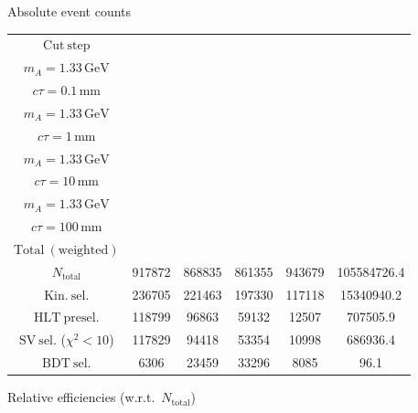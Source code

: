 \documentclass[10pt,a4paper]{article}
\renewcommand{\arraystretch}{1.4}
\begin{document}
{\footnotesize\setlength{\tabcolsep}{4pt}\renewcommand{\arraystretch}{1.05}%
\vspace{12pt}

Absolute event counts

\begin{tabular}{cccccc}
\toprule
$\mathrm{Cut\ step}$ & \shortstack{$m_{\pi}=4\,\mathrm{GeV}$\\$m_{A}=1.33\,\mathrm{GeV}$\\$c\tau=0.1\,\mathrm{mm}$} & \shortstack{$m_{\pi}=4\,\mathrm{GeV}$\\$m_{A}=1.33\,\mathrm{GeV}$\\$c\tau=1\,\mathrm{mm}$} & \shortstack{$m_{\pi}=4\,\mathrm{GeV}$\\$m_{A}=1.33\,\mathrm{GeV}$\\$c\tau=10\,\mathrm{mm}$} & \shortstack{$m_{\pi}=4\,\mathrm{GeV}$\\$m_{A}=1.33\,\mathrm{GeV}$\\$c\tau=100\,\mathrm{mm}$} & \shortstack{$\mathrm{QCD}$\\$\mathrm{Total\ (weighted)}$} \\
\midrule
$N_{\mathrm{total}}$ & 917872 & 868835 & 861355 & 943679 & 105584726.4\\
$\mathrm{Kin.\ sel.}$ & 236705 & 221463 & 197330 & 117118 & 15340940.2\\
$\mathrm{HLT\ presel.}$ & 118799 & 96863 & 59132 & 12507 & 707505.9\\
$\mathrm{SV\ sel.}$ ($\chi^2{<}10$) & 117829 & 94418 & 53354 & 10998 & 686936.4\\
$\mathrm{BDT\ sel.}$ & 6306 & 23459 & 33296 & 8085 & 96.1\\
\bottomrule
\end{tabular}

\vspace{18pt}

Relative efficiencies (w.r.t.\ $N_{\mathrm{total}}$)

}
\end{document}
